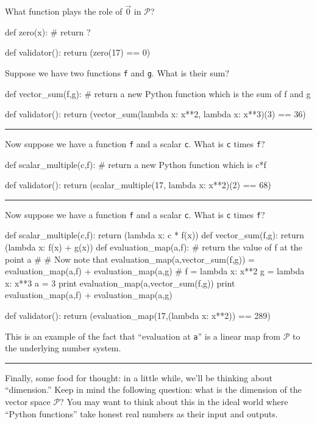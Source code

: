 \documentclass{ximera}
\begin{document}
\begin{question}
  What function plays the role of $\vec{0}$ in $\mathcal{P}$?
  \begin{solution}
    \begin{python}
def zero(x):
  # return ?  
    
def validator():
  return (zero(17) == 0)
    \end{python}
  \end{solution}

  Suppose we have two functions \texttt{f} and \texttt{g}.  What is their sum?
  \begin{solution}
    \begin{python}
def vector_sum(f,g):
  # return a new Python function which is the sum of f and g
    
def validator():
  return (vector_sum(lambda x: x**2, lambda x: x**3)(3) == 36)
    \end{python}
  \end{solution}

  \hrule

  Now suppose we have a function \texttt{f} and a scalar \texttt{c}.  What is \texttt{c} times \texttt{f}?
  \begin{solution}
    \begin{python}
def scalar_multiple(c,f):
  # return a new Python function which is c*f
    
def validator():
  return (scalar_multiple(17, lambda x: x**2)(2) == 68)
    \end{python}
  \end{solution}

  \hrule

    Now suppose we have a function \texttt{f} and a scalar \texttt{c}.  What is \texttt{c} times \texttt{f}?
  \begin{solution}
    \begin{python}
def scalar_multiple(c,f):
  return (lambda x: c * f(x))
def vector_sum(f,g):
  return (lambda x: f(x) + g(x))
def evaluation_map(a,f):
  # return the value of f at the point a
#
# Now note that evaluation_map(a,vector_sum(f,g)) = evaluation_map(a,f) + evaluation_map(a,g)
#
f = lambda x: x**2
g = lambda x: x**3
a = 3
print evaluation_map(a,vector_sum(f,g))
print evaluation_map(a,f) + evaluation_map(a,g)
    
def validator():
  return (evaluation_map(17,(lambda x: x**2)) == 289)
    \end{python}
  \end{solution}

  This is an example of the fact that ``evaluation at \texttt{a}'' is a linear map from $\mathcal{P}$ to the underlying number system.

  \hrule

  Finally, some food for thought: in a little while, we'll be thinking
  about ``dimension.''  Keep in mind the following question: what is
  the dimension of the vector space $\mathcal{P}$?  You may want to
  think about this in the ideal world where ``Python functions'' take
  honest real numbers as their input and outputs.
\end{question}
\end{document}

